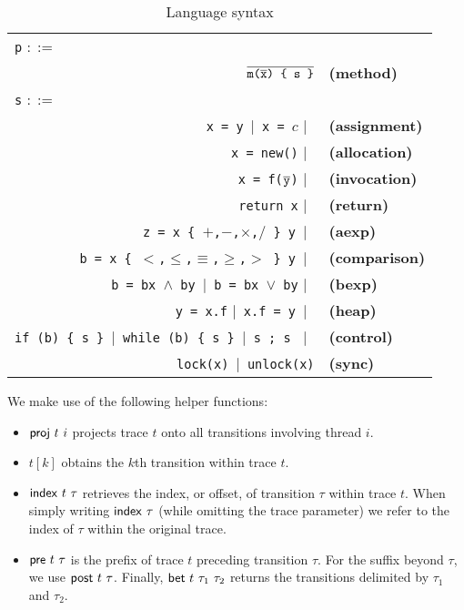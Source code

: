 \begin{table}
	\begin{center}
	\begin{tabular}{rl}
						\multicolumn{1}{l}{{\tt p} $::=$} & \\
					    $\overline{\texttt{m($\overline{{\tt x}}$) \{ s \}}}$ & {\bf (method)} \\
						\multicolumn{1}{l}{{\tt s} $::=$} & \\
						{\tt x = y}\ $|$\ {\tt x = $c$} $|$\ & {\bf (assignment)} \\
						{\tt x = new()} $|$\ & {\bf (allocation)} \\
						{\tt x = f($\overline{{\tt y}}$)} $|$\ & {\bf (invocation)} \\
						{\tt return x} $|$\ & {\bf (return)} \\
						{\tt z = x \{ $+$,$-$,$\times$,$/$ \} y}\ $|$\ & {\bf (aexp)} \\
						{\tt b = x \{ $<$,$\leq$,$\equiv$,$\geq$,$>$ \} y}\ $|$\ & {\bf (comparison)} \\
						{\tt b = bx $\wedge$ by}\ $|$\ {\tt b = bx $\vee$ by} $|$\ & {\bf (bexp)} \\
						{\tt y = x.f} $|$\ {\tt x.f = y}\ $|$\ & {\bf (heap)} \\
						{\tt if (b) \{ s \} $|$\ {\tt while (b) \{  s \}} $|$\ {\tt s ; s }} $|$\ & {\bf (control)} \\
						{\tt lock(x)}\ $|$\ {\tt unlock(x)} & {\bf (sync)}
	\end{tabular}
	\end{center}
	\caption{\label{Ta:syntax}Language syntax}
\end{table}

We make use of the following helper functions:
\begin{itemize}
	\item ${\sf proj}\ t\ i$ projects trace $t$ onto all transitions involving thread $i$.
	\item $t[k]$ obtains the $k$th transition within trace $t$.
	\item ${\sf index}\ t\ \tau$ retrieves the index, or offset, of transition $\tau$ within trace $t$. When simply writing
	 ${\sf index}\ \tau$ (while omitting the trace parameter) we refer to the index of $\tau$ within the original trace. 
	\item ${\sf pre}\ t\ \tau$ is the prefix of trace $t$ preceding transition $\tau$. For the suffix beyond $\tau$, we 
	use ${\sf post}\ t\ \tau$. Finally, ${\sf bet}\ t\ \tau_1\ \tau_2$ returns the transitions delimited by $\tau_1$ and $\tau_2$.
\end{itemize}

